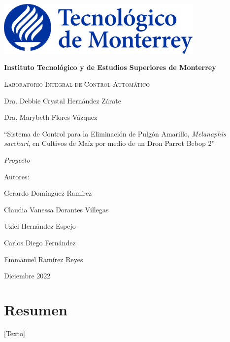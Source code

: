 \documentclass[11pt]{exam}
\begin{document}
    \begin{titlepage}
        \centering
        {\includegraphics[width = 4in]{pictures/itesm-logo.png}\par}
        \vspace{0.4in}
        {\bfseries\LARGE Instituto Tecnol\'ogico y de Estudios Superiores de Monterrey \par}
        \vspace{0.4in}
        {\scshape\Large Laboratorio Integral de Control Automático \par}
        {\Large Dra. Debbie Crystal Hernández Zárate \par}
        {\Large Dra. Marybeth Flores Vázquez \par}
        \vspace{1.2in}
        {\Large ``Sistema de Control para la Eliminaci\'on de Pulg\'on Amarillo, \textit{Melanaphis sacchari}, en Cultivos de Maíz por medio de un Dron Parrot Bebop 2'' \par}
        \vspace{1.2in}
        {\itshape\Large Proyecto \par}
        \vfill
        {\Large Autores: \par}
        {\Large Gerardo Dom\'inguez Ram\'irez\par}
        {\Large Claudia Vanessa Dorantes Villegas\par}
        {\Large Uziel Hernández Espejo\par}
        {\Large Carlos Diego Fernández\par}
        {\Large Emmanuel Ramírez Reyes\par}
        \vfill
        {\Large Diciembre 2022 \par}
    \end{titlepage}

    \headrule
    \footrule

    \section*{Resumen}
        [Texto]
    
\end{document}
